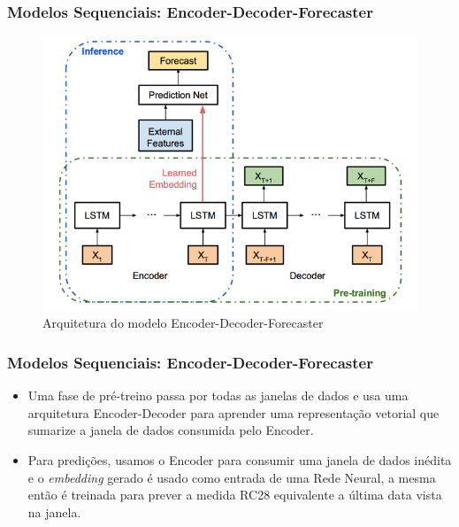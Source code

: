 \documentclass{beamer}
\begin{document}
\begin{frame}
\frametitle{Modelos Sequenciais: Encoder-Decoder-Forecaster}
\begin{figure}[H]
\centering
\includegraphics[scale=0.4]{uber.png}
\caption{Arquitetura do modelo Encoder-Decoder-Forecaster}
\end{figure}
\end{frame}

\begin{frame}
\frametitle{Modelos Sequenciais: Encoder-Decoder-Forecaster}

\begin{itemize}
  \item Uma fase de pré-treino passa por todas as janelas de dados e usa uma
    arquitetura Encoder-Decoder para aprender uma representação vetorial que
    sumarize a janela de dados consumida pelo Encoder. 
  \item Para predições, usamos o Encoder para consumir uma janela de dados
    inédita e o \textit{embedding} gerado é usado como entrada de uma Rede Neural, a mesma então é
    treinada para prever a medida RC28 equivalente a última data vista na
    janela. 
  
  \end{itemize}

\end{frame}
\end{document}
